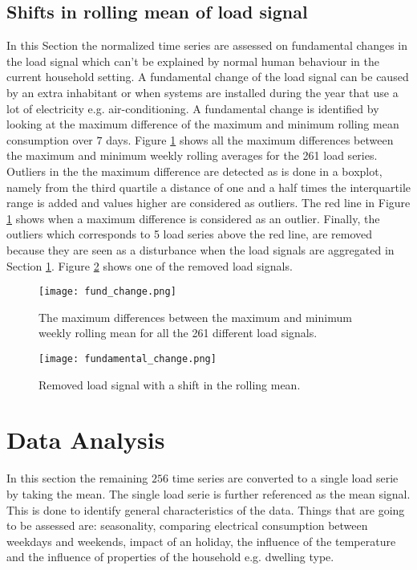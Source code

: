 \subsection{Shifts in rolling mean of load signal} \label{s:Shifts in rolling mean of load signal}
In this Section the normalized time series are assessed on fundamental changes in the load signal which can't be explained by normal human behaviour in the current household setting. A fundamental change of the load signal can be caused by an extra inhabitant or when systems are installed during the year that use a lot of electricity e.g. air-conditioning. A fundamental change is identified by looking at the maximum difference of the maximum and minimum rolling mean consumption over $ 7 $ days. Figure \ref{fig:fund_change} shows all the maximum differences between the maximum and minimum weekly rolling averages for the 261 load series. Outliers in the the maximum difference are detected as is done in a boxplot, namely from the third quartile a distance of one and a half times the interquartile range is added and values higher are considered as outliers. The red line in Figure \ref{fig:fund_change} shows when a maximum difference is considered as an outlier. Finally, the outliers which corresponds to 5 load series above the red line, are removed because they are seen as a disturbance when the load signals are aggregated in Section \ref{s:Data Analysis}. Figure \ref{fig:rolling_mean_shift} shows one of the removed load signals. 

\begin{figure}[h!]
	\centering
	\texttt{[image: fund\_change.png]}
	\caption{The maximum differences between the maximum and minimum weekly rolling mean for all the 261 different load signals.}
	\label{fig:fund_change}
\end{figure}


\begin{figure}[h!]
	\centering
	\texttt{[image: fundamental\_change.png]}
	\caption{Removed load signal with a shift in the rolling mean.}
	\label{fig:rolling_mean_shift}
\end{figure}


\section{Data Analysis}\label{s:Data Analysis}
In this section the remaining $256$ time series are converted to a single load serie by taking the mean. The single load serie is further referenced as the mean signal. This is done to identify general characteristics of the data. Things that are going to be assessed are: seasonality, comparing electrical consumption between weekdays and weekends, impact of an holiday, the influence of the temperature and the influence of properties of the household e.g. dwelling type.


